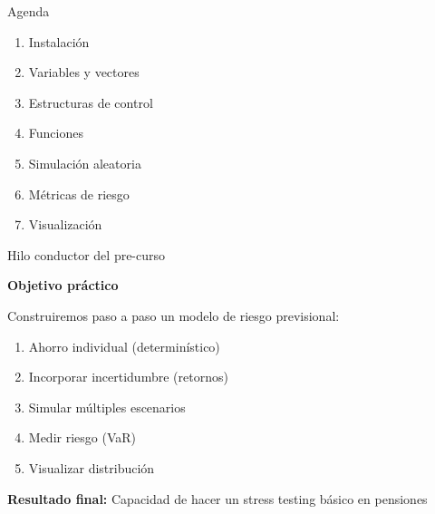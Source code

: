 \documentclass[10pt]{beamer}
\begin{document}
\begin{frame}[t]{Agenda}

\begin{enumerate}
\item Instalación
\item Variables y vectores
\item Estructuras de control
\item Funciones
\item Simulación aleatoria
\item Métricas de riesgo
\item Visualización
\end{enumerate}

\end{frame}

\begin{frame}{Hilo conductor del pre-curso}

\textbf{Objetivo práctico}

\vspace{0.3cm}
Construiremos paso a paso un modelo de riesgo previsional:

\begin{enumerate}
\item Ahorro individual (determinístico)
\item Incorporar incertidumbre (retornos)
\item Simular múltiples escenarios
\item Medir riesgo (VaR)
\item Visualizar distribución
\end{enumerate}

\vspace{0.5cm}

\textbf{Resultado final:}
Capacidad de hacer un stress testing básico en pensiones

\end{frame}

\end{document}

